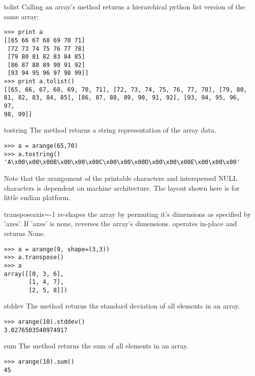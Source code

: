 \begin{methoddesc}[numarray]{tolist}{}
  \label{arraymethod:tolist}
   Calling an array's  method returns a hierarchical python list
   version of the same array:
\begin{verbatim}
>>> print a
[[65 66 67 68 69 70 71]
 [72 73 74 75 76 77 78]
 [79 80 81 82 83 84 85]
 [86 87 88 89 90 91 92]
 [93 94 95 96 97 98 99]]
>>> print a.tolist()
[[65, 66, 67, 68, 69, 70, 71], [72, 73, 74, 75, 76, 77, 78], [79, 80,
81, 82, 83, 84, 85], [86, 87, 88, 89, 90, 91, 92], [93, 94, 95, 96, 97,
98, 99]]
\end{verbatim}
\end{methoddesc}


\begin{methoddesc}[numarray]{tostring}{}
  \label{arraymethod:tostring}
   The  method returns a string representation of the 
   array data.
\begin{verbatim}
>>> a = arange(65,70)
>>> a.tostring()
'A\x00\x00\x00B\x00\x00\x00C\x00\x00\x00D\x00\x00\x00E\x00\x00\x00'
\end{verbatim}
Note that the arangement of the printable characters and interspersed NULL
characters is dependent on machine architecture.  The layout shown here is
for little endian platform.
\end{methoddesc}


\begin{methoddesc}[numarray]{transpose}{axis=-1}
  \label{arraymethod:transpose}
   re-shapes the array by permuting it's dimensions
  as specified by 'axes'.  If 'axes' is none, 
  reverses the array's dimensions.   operates
  in-place and returns None.
\begin{verbatim}
>>> a = arange(9, shape=(3,3))
>>> a.transpose()
>>> a
array([[0, 3, 6],
       [1, 4, 7],
       [2, 5, 8]])
\end{verbatim}
\end{methoddesc}


\begin{methoddesc}[numarray]{stddev}{}
  \label{arraymethod:stddev}
  The  method returns the standard deviation of all elements in
  an array.
\begin{verbatim}
>>> arange(10).stddev()
3.0276503540974917
\end{verbatim}
\end{methoddesc}


\begin{methoddesc}[numarray]{sum}{}
  \label{arraymethod:sum}
  The  method returns the sum of all elements in an array.
\begin{verbatim}
>>> arange(10).sum()
45
\end{verbatim}
\end{methoddesc}


